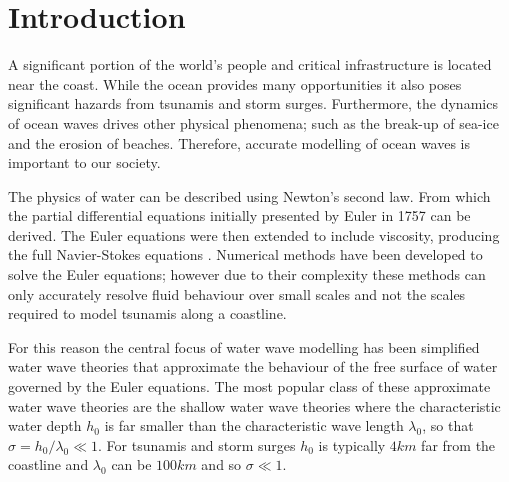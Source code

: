 \chapter{Introduction}
\label{chp:Introduction}

A significant portion of the world's people and critical infrastructure is located near the coast. While the ocean provides many opportunities it also poses significant hazards from tsunamis and storm surges. Furthermore, the dynamics of ocean waves drives other physical phenomena; such as the break-up of sea-ice and the erosion of beaches. Therefore, accurate modelling of ocean waves is important to our society. 

The physics of water can be described using Newton's second law. From which the partial differential equations initially presented by Euler in 1757 \cite{Euler-1755-274} can be derived. The Euler equations were then extended to include viscosity, producing the full Navier-Stokes equations \cite{navier1823,stokes1845gg}. Numerical methods \cite{Chorin-1967-928,Taylor-Hood-1973-73,Bassi-1997-267} have been developed to solve the Euler equations; however due to their complexity these methods can only accurately resolve fluid behaviour over small scales and not the scales required to model tsunamis along a coastline. 

For this reason the central focus of water wave modelling has been simplified water wave theories that approximate the behaviour of the free surface of water governed by the Euler equations. The most popular class of these approximate water wave theories are the shallow water wave theories where the characteristic water depth $h_0$ is far smaller than the characteristic wave length $\lambda_0$, so that $\sigma = h_0 / \lambda_0 \ll 1$. For tsunamis and storm surges $h_0$ is typically $4km$ far from the coastline and $\lambda_0$ can be $100km$ and so $\sigma\ll 1$.


